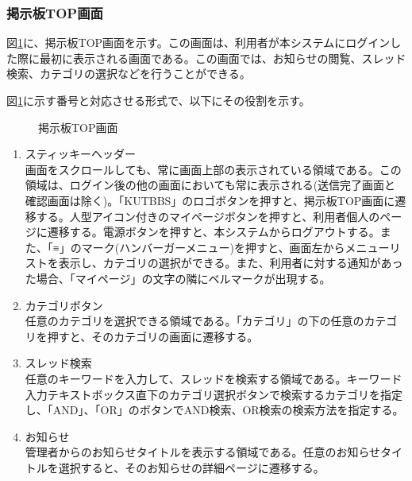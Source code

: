 \documentclass[a4j]{jarticle}
\begin{document}
\subsubsection{掲示板TOP画面}
図\ref{fig:BBS_top}に、掲示板TOP画面を示す。この画面は、利用者が本システムにログインした際に最初に表示される画面である。この画面では、お知らせの閲覧、スレッド検索、カテゴリの選択などを行うことができる。

図\ref{fig:BBS_top}に示す番号と対応させる形式で、以下にその役割を示す。
\begin{figure}[H]
\centering
{}
\caption{掲示板TOP画面}
\label{fig:BBS_top}
\end{figure}
\begin{enumerate}
  \renewcommand{\labelenumi}{\textcircled{\scriptsize \theenumi}}
  \item スティッキーヘッダー\\
  画面をスクロールしても、常に画面上部の表示されている領域である。この領域は、ログイン後の他の画面においても常に表示される(送信完了画面と確認画面は除く)。「KUTBBS」のロゴボタンを押すと、掲示板TOP画面に遷移する。人型アイコン付きのマイページボタンを押すと、利用者個人のページに遷移する。電源ボタンを押すと、本システムからログアウトする。また、「≡」のマーク(ハンバーガーメニュー)を押すと、画面左からメニューリストを表示し、カテゴリの選択ができる。また、利用者に対する通知があった場合、「マイページ」の文字の隣にベルマークが出現する。
  \item カテゴリボタン\\
  任意のカテゴリを選択できる領域である。「カテゴリ」の下の任意のカテゴリを押すと、そのカテゴリの画面に遷移する。
  \item スレッド検索\\
  任意のキーワードを入力して、スレッドを検索する領域である。キーワード入力テキストボックス直下のカテゴリ選択ボタンで検索するカテゴリを指定し、「AND」、「OR」のボタンでAND検索、OR検索の検索方法を指定する。
  \item お知らせ\\
  管理者からのお知らせタイトルを表示する領域である。任意のお知らせタイトルを選択すると、そのお知らせの詳細ページに遷移する。
\end{enumerate}
\end{document}
